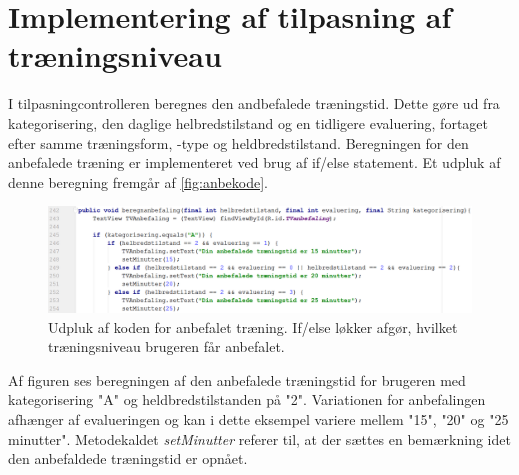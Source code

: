 \section{Implementering af tilpasning af træningsniveau}
I tilpasningcontrolleren beregnes den andbefalede træningstid. Dette gøre ud fra kategorisering, den daglige helbredstilstand og en tidligere evaluering, fortaget efter samme træningsform, -type og heldbredstilstand.
Beregningen for den anbefalede træning er implementeret ved brug af if/else statement. Et udpluk af denne beregning fremgår af \autoref{fig:anbekode}.  
   
\begin{figure} [H]
\centering
\includegraphics[width=1\textwidth]{figures/imple/anbekode}
\caption{Udpluk af koden for anbefalet træning. If/else løkker afgør, hvilket træningsniveau brugeren får anbefalet.}
\label{fig:anbekode}
\end{figure} 

\noindent
Af figuren ses beregningen af den anbefalede træningstid for brugeren med kategorisering "A" og heldbredstilstanden på "2". Variationen for anbefalingen afhænger af evalueringen og kan i dette eksempel variere mellem "15", "20" og "25 minutter". Metodekaldet \textit{setMinutter} referer til, at der sættes en bemærkning idet den anbefaldede træningstid er opnået.

